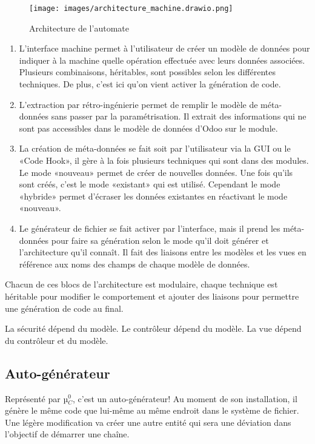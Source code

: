 \begin{figure}[htb]
\centering
\texttt{[image: images/architecture\_machine.drawio.png]}
\caption{Architecture de l'automate}
\label{fig:dia_architecture_automate}
\end{figure}

\begin{enumerate}
    \item L’interface machine permet à l’utilisateur de créer un modèle de données pour indiquer à la machine quelle opération effectuée avec leurs données associées. Plusieurs combinaisons, héritables, sont possibles selon les différentes techniques. De plus, c’est ici qu’on vient activer la génération de code.
    \item L’extraction par rétro-ingénierie permet de remplir le modèle de méta-données sans passer par la paramétrisation. Il extrait des informations qui ne sont pas accessibles dans le modèle de données d’Odoo sur le module.
    \item La création de méta-données se fait soit par l’utilisateur via la GUI ou le «Code Hook», il gère à la fois plusieurs techniques qui sont dans des modules. Le mode «nouveau» permet de créer de nouvelles données. Une fois qu’ils sont créés, c’est le mode «existant» qui est utilisé. Cependant le mode «hybride» permet d’écraser les données existantes en réactivant le mode «nouveau».
    \item Le générateur de fichier se fait activer par l’interface, mais il prend les méta-données pour faire sa génération selon le mode qu’il doit générer et l’architecture qu’il connaît. Il fait des liaisons entre les modèles et les vues en référence aux noms des champs de chaque modèle de données.
\end{enumerate}

Chacun de ces blocs de l’architecture est modulaire, chaque technique est héritable pour modifier le comportement et ajouter des liaisons pour permettre une génération de code au final.

La sécurité dépend du modèle. Le contrôleur dépend du modèle. La vue dépend du contrôleur et du modèle.

\subsection{Auto-générateur}

Représenté par µ$_C^0$, c’est un auto-générateur! Au moment de son installation, il génère le même code que lui-même au même endroit dans le système de fichier. Une légère modification va créer une autre entité qui sera une déviation dans l’objectif de démarrer une chaîne.

